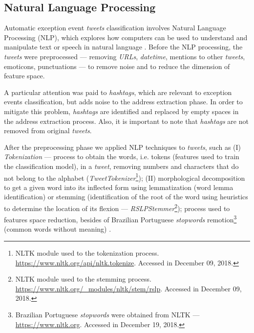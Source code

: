 \documentclass[runningheads]{llncs}
\begin{document}

\subsection{Natural Language Processing}
\label{nlp}

Automatic exception event \textit{tweets} classification involves Natural Language Processing (NLP), which explores how computers can be used to understand and manipulate text or speech in natural language \cite{liu2017roadmap}. Before the NLP processing, the \textit{tweets} were preprocessed --- removing \textit{URLs}, \textit{datetime}, mentions to other \textit{tweets}, emoticons, punctuations --- to remove noise and to reduce the dimension of feature space.

A particular attention was paid to \textit{hashtags}, which are relevant to exception events classification, but adds noise to the address extraction phase. In order to mitigate this problem, \textit{hashtags} are identified and replaced by empty spaces in the address extraction process. Also, it is important to note that \textit{hashtags} are not removed from original \textit{tweets}.

After the preprocessing phase we applied NLP techniques to \textit{tweets}, such as (I) \textit{Tokenization} --- process to obtain the words, i.e. tokens (features used to train the classification model), in a \textit{tweet}, removing numbers and characters that do not belong to the alphabet (\textit{TweetTokenizer}\footnote{NLTK module used to the tokenization process. \url{https://www.nltk.org/api/nltk.tokenize}. Accessed in December 09, 2018.}); (II) morphological decomposition to get a given word into its inflected form using lemmatization (word lemma identification) or stemming (identification of the root of the word using heuristics to determine the location of its flexion --- \textit{RSLPStemmer}\footnote{NLTK module used to the stemming process. \url{https://www.nltk.org/\_modules/nltk/stem/rslp}. Accessed in December 09, 2018.}); process used to features space reduction, besides of Brazilian Portuguese \textit{stopwords} remotion\footnote{Brazilian Portuguese \textit{stopwords} were obtained from NLTK --- \url{https://www.nltk.org}. Accessed in December 19, 2018.} (common words without meaning) \cite{Setiawan2017, nadkarni2011natural, Korenius, roy2017understanding, collobert2011natural}.
\end{document}
